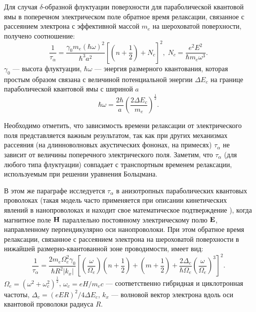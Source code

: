 Для случая $\delta$-образной флуктуации поверхности для параболической квантовой ямы в поперечном электрическом поле обратное время релаксации, связанное с рассеянием электрона с эффективной массой $m_e$ на шероховатой поверхности, получено соотношение: 
\begin{equation} \label{eq:syn_01}
\frac{1}{\tau _{\alpha } } =\frac{\gamma_0 m_e (\hbar\omega)^2 }{\hbar^3 a^2 } \left[\left(n+\frac{1}{2} \right)+N_c \right]^2, \;
N_c =\frac{e^2 E^2 }{\hbar m_e \omega^3 } .
\end{equation}  
$\gamma_0 $ --- высота флуктуации, $\hbar\omega$ --- энергия размерного квантования, которая простым образом связана с величиной потенциальной энергии $\Delta E_c$ на границе параболической квантовой ямы с шириной $a$
\[
\hbar\omega = \frac{2\hbar}{a}\left(  \frac{2\Delta E_c}{m_e} \right)^{\frac{1}{2}}.
\]

Необходимо отметить, что зависимость времени релаксации от электрического поля представляется важным результатом, так как при других механизмах рассеяния (на длинноволновых акустических фононах, на примесях) $\tau_\alpha$ не зависит от величины поперечного электрического поля. Заметим, что $\tau_\alpha$ (для любого типа флуктуации) совпадает с транспортным временем релаксации, используемым при решении уравнения Больцмана.

В этом же параграфе исследуется $\tau_\alpha$ в анизотропных параболических квантовых проволоках (такая модель часто применяется при описании кинетических явлений в нанопроволоках \cite{Geiler1998,Geiler1999,Cros1992} и находит свое математическое подтверждение \cite{Beenakker1991}), когда магнитное поле $\boldsymbol{\mathbf{H}}$ параллельно постоянному электрическому полю $\boldsymbol{\mathbf{E}}$, направленному перпендикулярно оси нанопроволоки. При этом обратное время релаксации, связанное с рассеянием электрона на шероховатой поверхности в нижайшей размерно-квантованной зоне проводимости, имеет вид:
\begin{equation} \label{eq:syn_02}
\frac{1}{\tau_\alpha}=\frac{2m_e\Omega^2_e \gamma_0}{\hbar R^2 \left|k_x\right|} \left[\left(\frac{\omega}{\Omega_e}\right) \left(n+\frac{1}{2}\right)+ \left(m+\frac{1}{2}\right)+ \frac{2\Delta_c}{\hbar\Omega_e} \left(\frac{\omega}{\Omega_e}\right)^3\right]^2.
\end{equation}
$\Omega_e= \left( \omega^2 + \omega_c^2 \right)^{\frac{1}{2}}$, $\omega_c = eH/m_ec$ --- соответственно гибридная и циклотронная частоты, $\Delta_c = (eER)^2/4\Delta E_c$, $k_x$ --- волновой вектор электрона вдоль оси квантовой проволоки радиуса $R$.

